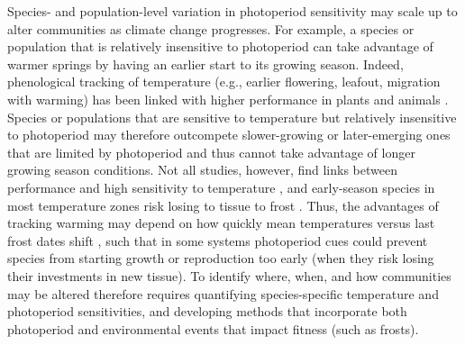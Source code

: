 \documentclass{article}
\begin{document}
\par Species- and population-level variation in photoperiod sensitivity may scale up to alter communities as climate change progresses. For example, a species or population that is relatively insensitive to photoperiod can take advantage of warmer springs by having an earlier start to its growing season. Indeed, phenological tracking of temperature (e.g., earlier flowering, leafout, migration with warming) has been linked with higher performance in plants and animals \citep{cleland2012,muir1994,willis2010}. Species or populations that are sensitive to temperature but relatively insensitive to photoperiod may therefore outcompete slower-growing or later-emerging ones that are limited by photoperiod and thus cannot take advantage of longer growing season conditions. Not all studies, however, find links between performance and high sensitivity to temperature \citep[e.g.,][]{block2020}, and early-season species in most temperature zones risk losing to tissue to frost \citep{frostbook}. Thus, the advantages of tracking warming may depend on how quickly mean temperatures versus last frost dates shift \citep[e.g.,][]{inouye2002}, such that in some systems photoperiod cues could prevent species from starting growth or reproduction too early (when they risk losing their investments in new tissue). To identify where, when, and how communities may be altered therefore requires quantifying species-specific temperature and photoperiod sensitivities, and developing methods that incorporate both photoperiod and environmental events that impact fitness (such as frosts).
\end{document}
